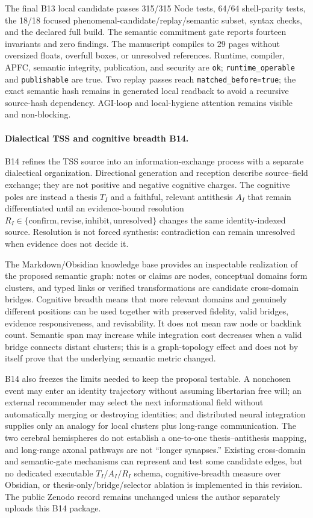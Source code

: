 \documentclass[10pt,twocolumn]{article}
\theoremstyle{definition}
\theoremstyle{plain}
\theoremstyle{remark}
\newcommand{\file}[1]{\nolinkurl{#1}}
\newcommand{\dialecticrevision}{\textsf{B14}}
\begin{document}
The final B13 local candidate passes 315/315 Node tests, 64/64 shell-parity tests, the 18/18 focused phenomenal-candidate/replay/semantic subset, syntax checks, and the declared full build.  The semantic commitment gate reports fourteen invariants and zero findings.  The manuscript compiles to 29 pages without oversized floats, overfull boxes, or unresolved references.  Runtime, compiler, APFC, semantic integrity, publication, and security are \file{ok}; \file{runtime\_operable} and \file{publishable} are true.  Two replay passes reach \file{matched\_before=true}; the exact semantic hash remains in generated local readback to avoid a recursive source-hash dependency.  AGI-loop and local-hygiene attention remains visible and non-blocking.

\paragraph{Dialectical TSS and cognitive breadth \dialecticrevision.}
B14 refines the TSS source into an information-exchange process with a separate dialectical organization.  Directional generation and reception describe source--field exchange; they are not positive and negative cognitive charges.  The cognitive poles are instead a thesis $T_I$ and a faithful, relevant antithesis $A_I$ that remain differentiated until an evidence-bound resolution $R_I\in\{\text{confirm},\text{revise},\text{inhibit},\text{unresolved}\}$ changes the same identity-indexed source.  Resolution is not forced synthesis: contradiction can remain unresolved when evidence does not decide it.

The Markdown/Obsidian knowledge base provides an inspectable realization of the proposed semantic graph: notes or claims are nodes, conceptual domains form clusters, and typed links or verified transformations are candidate cross-domain bridges.  Cognitive breadth means that more relevant domains and genuinely different positions can be used together with preserved fidelity, valid bridges, evidence responsiveness, and revisability.  It does not mean raw node or backlink count.  Semantic span may increase while integration cost decreases when a valid bridge connects distant clusters; this is a graph-topology effect and does not by itself prove that the underlying semantic metric changed.

B14 also freezes the limits needed to keep the proposal testable.  A nonchosen event may enter an identity trajectory without assuming libertarian free will; an external recommender may select the next informational field without automatically merging or destroying identities; and distributed neural integration supplies only an analogy for local clusters plus long-range communication.  The two cerebral hemispheres do not establish a one-to-one thesis--antithesis mapping, and long-range axonal pathways are not ``longer synapses.''  Existing cross-domain and semantic-gate mechanisms can represent and test some candidate edges, but no dedicated executable $T_I/A_I/R_I$ schema, cognitive-breadth measure over Obsidian, or thesis-only/bridge/selector ablation is implemented in this revision.  The public Zenodo record remains unchanged unless the author separately uploads this B14 package.
\end{document}
